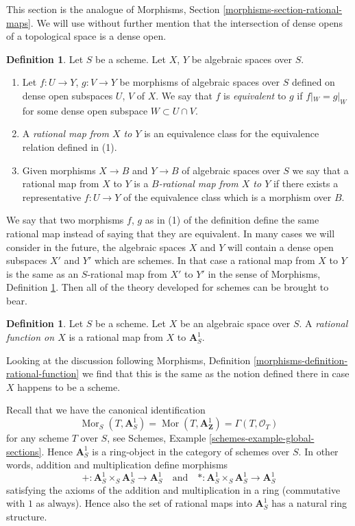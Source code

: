 \documentclass{stacks-project}
\theoremstyle{plain}
\theoremstyle{definition}
\newtheorem{definition}[subsection]{Definition}
\theoremstyle{remark}
\numberwithin{equation}{subsection}
\def\Mor{\mathop{\mathrm{Mor}}\nolimits}
\begin{document}
\noindent
This section is the analogue of
Morphisms, Section \ref{morphisms-section-rational-maps}.
We will use without further mention that the intersection of dense opens
of a topological space is a dense open.

\begin{definition}
\label{definition-rational-map}
Let $S$ be a scheme. Let $X$, $Y$ be algebraic spaces over $S$.
\begin{enumerate}
\item Let $f : U \to Y$, $g : V \to Y$ be morphisms of algebraic spaces
over $S$ defined on dense open subspaces $U$, $V$ of $X$. We say that $f$ is
{\it equivalent} to $g$ if $f|_W = g|_W$ for some dense open
subspace $W \subset U \cap V$.
\item A {\it rational map from $X$ to $Y$}
is an equivalence class for the equivalence relation defined in (1).
\item Given morphisms $X \to B$ and $Y \to B$ of algebraic spaces over $S$
we say that a rational map from $X$ to $Y$ is a
{\it $B$-rational map from $X$ to $Y$}
if there exists a representative $f : U \to Y$ of the equivalence
class which is a morphism over $B$.
\end{enumerate}
\end{definition}

\noindent
We say that two morphisms $f$, $g$ as in (1) of the definition
define the same rational map instead of saying that they are equivalent.
In many cases we will consider in the future, the algebraic spaces
$X$ and $Y$ will contain a dense open subspaces $X'$ and $Y'$ which
are schemes. In that case a rational map from $X$ to $Y$ is the same
as an $S$-rational map from $X'$ to $Y'$ in the sense of
Morphisms, Definition \ref{definition-rational-map}.
Then all of the theory developed for schemes can be brought to bear.

\begin{definition}
\label{definition-rational-function}
Let $S$ be a scheme. Let $X$ be an algebraic space over $S$. A
{\it rational function on $X$} is a rational map from $X$ to $\mathbf{A}^1_S$.
\end{definition}

\noindent
Looking at the discussion following
Morphisms, Definition \ref{morphisms-definition-rational-function}
we find that this is the same as the notion defined there in case
$X$ happens to be a scheme.

\medskip\noindent
Recall that we have the canonical identification
$$
\Mor_S(T, \mathbf{A}^1_S) = \Mor(T, \mathbf{A}^1_\mathbf{Z}) =
\Gamma(T, \mathcal{O}_T)
$$
for any scheme $T$ over $S$, see
Schemes, Example \ref{schemes-example-global-sections}.
Hence $\mathbf{A}^1_S$ is a ring-object in the
category of schemes over $S$. In other words, addition
and multiplication define morphisms
$$
+ : \mathbf{A}^1_S \times_S \mathbf{A}^1_S \to \mathbf{A}^1_S
\quad\text{and}\quad
* : \mathbf{A}^1_S \times_S \mathbf{A}^1_S \to \mathbf{A}^1_S
$$
satisfying the axioms of the addition and multiplication in a ring
(commutative with $1$ as always). Hence also the set of rational
maps into $\mathbf{A}^1_S$ has a natural ring structure.
\end{document}
